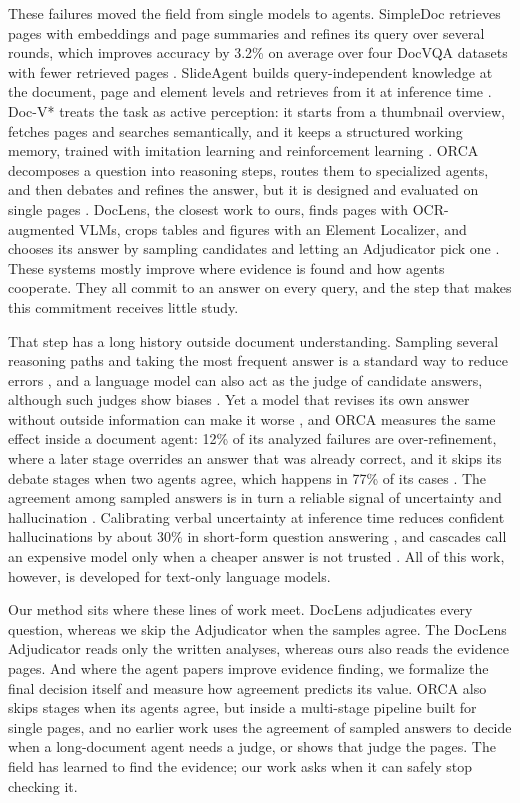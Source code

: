 \documentclass[conference]{IEEEtran}
\begin{document}
These failures moved the field from single models to agents. SimpleDoc retrieves pages with embeddings and page summaries and refines its query over several rounds, which improves accuracy by 3.2\% on average over four DocVQA datasets with fewer retrieved pages \cite{jain2025simpledoc}. SlideAgent builds query-independent knowledge at the document, page and element levels and retrieves from it at inference time \cite{slideagent}. Doc-V* treats the task as active perception: it starts from a thumbnail overview, fetches pages and searches semantically, and it keeps a structured working memory, trained with imitation learning and reinforcement learning \cite{docvstar}. ORCA decomposes a question into reasoning steps, routes them to specialized agents, and then debates and refines the answer, but it is designed and evaluated on single pages \cite{orca}. DocLens, the closest work to ours, finds pages with OCR-augmented VLMs, crops tables and figures with an Element Localizer, and chooses its answer by sampling candidates and letting an Adjudicator pick one \cite{zhu2025doclens}. These systems mostly improve where evidence is found and how agents cooperate. They all commit to an answer on every query, and the step that makes this commitment receives little study.

That step has a long history outside document understanding. Sampling several reasoning paths and taking the most frequent answer is a standard way to reduce errors \cite{wang2023selfconsistency}, and a language model can also act as the judge of candidate answers, although such judges show biases \cite{zheng2023judging}. Yet a model that revises its own answer without outside information can make it worse \cite{huang2024selfcorrect}, and ORCA measures the same effect inside a document agent: 12\% of its analyzed failures are over-refinement, where a later stage overrides an answer that was already correct, and it skips its debate stages when two agents agree, which happens in 77\% of its cases \cite{orca}. The agreement among sampled answers is in turn a reliable signal of uncertainty and hallucination \cite{kuhn2023semantic,manakul2023selfcheckgpt}. Calibrating verbal uncertainty at inference time reduces confident hallucinations by about 30\% in short-form question answering \cite{ji2025verbal}, and cascades call an expensive model only when a cheaper answer is not trusted \cite{chen2024frugalgpt}. All of this work, however, is developed for text-only language models.

Our method sits where these lines of work meet. DocLens adjudicates every question, whereas we skip the Adjudicator when the samples agree. The DocLens Adjudicator reads only the written analyses, whereas ours also reads the evidence pages. And where the agent papers improve evidence finding, we formalize the final decision itself and measure how agreement predicts its value. ORCA also skips stages when its agents agree, but inside a multi-stage pipeline built for single pages, and no earlier work uses the agreement of sampled answers to decide when a long-document agent needs a judge, or shows that judge the pages. The field has learned to find the evidence; our work asks when it can safely stop checking it.
\end{document}
